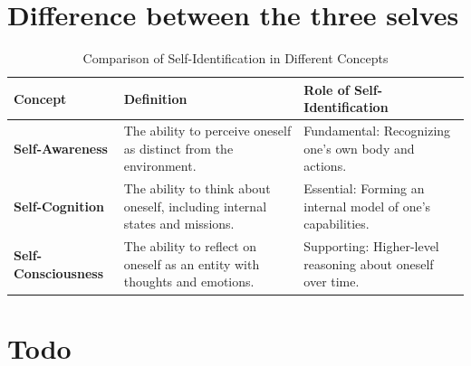 \section{Difference between the three selves}
\begin{table}[h!]
    \centering
    \begin{tabular}{|l|l|l|}
        \hline
        \textbf{Concept}
        & \textbf{Definition}
        & \textbf{Role of Self-Identification} \\ \hline
        \textbf{Self-Awareness}
        & The ability to perceive oneself as distinct from the environment.
        & Fundamental: Recognizing one’s own body and actions. \\ \hline
        \textbf{Self-Cognition}
        & The ability to think about oneself, including internal states and missions.
        & Essential: Forming an internal model of one’s capabilities. \\ \hline
        \textbf{Self-Consciousness}
        & The ability to reflect on oneself as an entity with thoughts and emotions.
        & Supporting: Higher-level reasoning about oneself over time. \\ \hline
    \end{tabular}
    \caption{Comparison of Self-Identification in Different Concepts}
\end{table}


\section{Todo}

